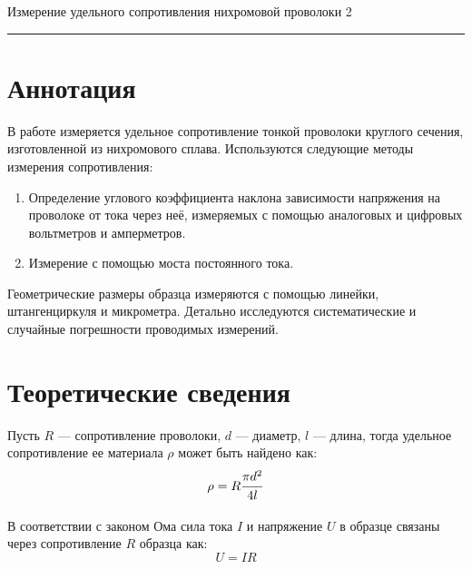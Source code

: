 \documentclass[12pt,a4paper]{scrartcl}
\begin{document}
	
	\begin{flushleft}
		\footnotesize{Измерение удельного сопротивления нихромовой проволоки} \hspace{\fill} \footnotesize{2}
		\\[-0.3cm]\noindent\rule{\textwidth}{0.3pt}
	\end{flushleft}

	\section{Аннотация}
	В работе измеряется удельное сопротивление тонкой проволоки круглого сечения, изготовленной из нихромового сплава. Используются следующие методы измерения сопротивления:
	\begin{enumerate}
		\item Определение углового коэффициента наклона зависимости напряжения на проволоке от тока
		через неё, измеряемых с помощью аналоговых и цифровых вольтметров и амперметров.
		\item Измерение с помощью моста постоянного тока.
	\end{enumerate}
	 Геометрические размеры образца измеряются с
	помощью линейки, штангенциркуля и микрометра. Детально исследуются систематические и случайные погрешности проводимых измерений. 
	
	\section{Теоретические сведения}
	Пусть $R$ --- сопротивление проволоки, $d$ --- диаметр, $l$ --- длина, тогда удельное сопротивление ее материала $\rho$ может быть найдено как: 
	\begin{equation}
		\rho = R\dfrac{\strut \pi d^2}{\strut 4l}
	\end{equation}

	В соответствии с законом Ома сила тока $I$ и напряжение $U$ в образце связаны через сопротивление $R$ образца как:
	\begin{equation}
		U = IR	
	\end{equation} 
\end{document}
